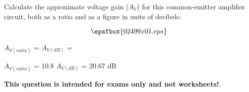 

Calculate the approximate voltage gain ($A_V$) for this common-emitter amplifier circuit, both as a ratio and as a figure in units of decibels:

$$\epsfbox{02499x01.eps}$$

$A_{V(ratio)}$ = \hskip 80pt $A_{V(dB)}$ = 







$A_{V(ratio)}$ = 10.8 \hskip 50pt $A_{V(dB)}$ = 20.67 dB







{\bf This question is intended for exams only and not worksheets!}.




